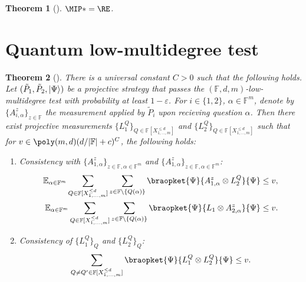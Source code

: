 \documentclass[english]{reedthesis}
\theoremstyle{plain}
\newtheorem{thm}{Theorem}[section]
\theoremstyle{definition}
\theoremstyle{remark}
\DeclarePairedDelimiter{\abs}{\lvert}{\rvert}
\DeclarePairedDelimiter\ket{\lvert}{\rangle}
\begin{document}
\begin{thm}[{\cite{JNVWY21}}]\label{thm:mip-star-is-re}
  $\MIP* = \RE$.
\end{thm}

\section{Quantum low-multidegree test}

\begin{thm}[{\cite{JNVWY20}}]\label{thm:quantum-low-degree}
  There is a universal constant $C > 0$ such that the following holds. Let
  $(\tilde{P}_{1}, \tilde{P}_{2}, \ket{\Psi})$ be a projective strategy that passes
  the $(\mathbb{F}, d, m)$-low-multidegree test with probability at least
  $1 - \varepsilon$. For $i \in \{1, 2\}$, $\alpha \in \mathbb{F}^{m}$, denote by
  $\{A_{i,\alpha}^{z}\}_{z \in \mathbb{F}}$ the measurement applied by $\tilde{P}_{i}$
  upon recieving question $\alpha$. Then there exist projective measurements
  $\{L_{1}^{Q}\}_{Q \in \mathbb{F}[X_{1, \ldots, m}^{\le d}]}$ and
  $\{L_{2}^{Q}\}_{Q \in \mathbb{F}[X_{1, \ldots, m}^{\le d}]}$ such that for
  $v \in \poly(m, d)(d/\abs{\mathbb{F}} + c)^{C}$, the following holds:
  \begin{enumerate}
    \item Consistency with
          $\{A_{1, \alpha}^{z}\}_{z \in \mathbb{F}, \alpha \in \mathbb{F}^{m}}$ and
          $\{A_{1, \alpha}^{z}\}_{z \in \mathbb{F}, \alpha \in \mathbb{F}^{m}}$:
          \begin{align}
            \mathbb{E}_{\alpha \in \mathbb{F}^{m}}\sum_{Q \in \mathbb{F}[X_{1, \ldots, m}^{\le d}]}\sum_{z \in \mathbb{F} \setminus \{Q(\alpha)\}}
            \braopket{\Psi}{A_{1,\alpha}^{z} \otimes L_{2}^{Q}}{\Psi} &\le v, \\
            \mathbb{E}_{\alpha \in \mathbb{F}^{m}}\sum_{Q \in \mathbb{F}[X_{1, \ldots, m}^{\le d}]}\sum_{z \in \mathbb{F} \setminus \{Q(\alpha)\}}
            \braopket{\Psi}{L_{1} \otimes A_{2,\alpha}^{z}}{\Psi} &\le v.
          \end{align}
    \item Consistency of $\{L_{1}^{Q}\}_{Q}$ and $\{L_{2}^{Q}\}_{Q}$:
          \begin{equation}
            \sum_{Q \ne Q' \in \mathbb{F}[X_{1, \ldots, m}^{\le d}]}\braopket{\Psi}{L_{1}^{Q} \otimes L_{2}^{Q}}{\Psi} \le v.
          \end{equation}
  \end{enumerate}
\end{thm}
\end{document}
